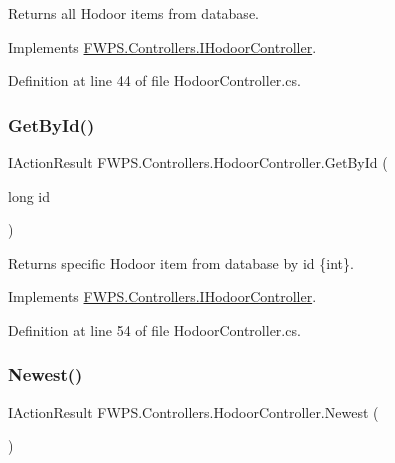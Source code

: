 Returns all Hodoor items from database. 



Implements \mbox{\hyperlink{interface_f_w_p_s_1_1_controllers_1_1_i_hodoor_controller_ac50e7afd931ca1f16f767cac2fae488e}{F\+W\+P\+S.\+Controllers.\+I\+Hodoor\+Controller}}.



Definition at line 44 of file Hodoor\+Controller.\+cs.

\mbox{\label{class_f_w_p_s_1_1_controllers_1_1_hodoor_controller_a27509de7aa39ce596b256d0cc4cc20f1}} 
\subsubsection{\texorpdfstring{Get\+By\+Id()}{GetById()}}
{\footnotesize\ttfamily I\+Action\+Result F\+W\+P\+S.\+Controllers.\+Hodoor\+Controller.\+Get\+By\+Id (\begin{DoxyParamCaption}\item[{long}]{id }\end{DoxyParamCaption})}



Returns specific Hodoor item from database by id \{int\}. 



Implements \mbox{\hyperlink{interface_f_w_p_s_1_1_controllers_1_1_i_hodoor_controller_a7676bf587ad504f1e5e7c1802f964489}{F\+W\+P\+S.\+Controllers.\+I\+Hodoor\+Controller}}.



Definition at line 54 of file Hodoor\+Controller.\+cs.

\mbox{\label{class_f_w_p_s_1_1_controllers_1_1_hodoor_controller_a35f759a06b813cb402420ab98e64000c}} 
\subsubsection{\texorpdfstring{Newest()}{Newest()}}
{\footnotesize\ttfamily I\+Action\+Result F\+W\+P\+S.\+Controllers.\+Hodoor\+Controller.\+Newest (\begin{DoxyParamCaption}{ }\end{DoxyParamCaption})}



